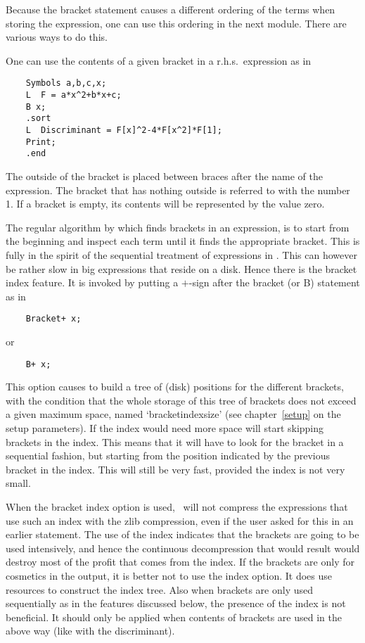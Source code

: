 Because the bracket statement causes a different ordering of the terms when 
storing the expression, one can use this ordering in the next module. There 
are various ways to do this.

One can use the contents of a given bracket in a r.h.s.\ expression as in
\begin{verbatim}
    Symbols a,b,c,x;
    L  F = a*x^2+b*x+c;
    B x;
    .sort
    L  Discriminant = F[x]^2-4*F[x^2]*F[1];
    Print;
    .end
\end{verbatim}
The outside of the bracket is placed between braces after the 
name of the expression. The bracket that has nothing outside is referred to 
with the number 1. If a bracket is empty, its contents will be represented 
by the value zero.

The regular algorithm by which \FORM{} finds brackets in an expression, is 
to start from the beginning and inspect each term until it finds the 
appropriate bracket. This is fully in the spirit of the sequential 
treatment of expressions in \FORM{}. This can however be rather 
slow in big 
expressions that reside on a disk. Hence there is the bracket 
index 
feature. It is invoked by putting a $+$-sign after the bracket (or B) 
statement as in 
\begin{verbatim}
    Bracket+ x;
\end{verbatim}
or
\begin{verbatim}
    B+ x;
\end{verbatim}
This option causes \FORM{} to build a tree of (disk) positions for the 
different brackets, with the condition that the whole storage of this tree 
of brackets does not exceed a given maximum space, named 
`bracketindexsize' 
(see chapter~\ref{setup} on the setup parameters). 
If the index would need more space \FORM{} will start 
skipping brackets in the index. This means that it will have to look for 
the bracket in a sequential fashion, but starting from the position 
indicated by the previous bracket in the index. This will still be very 
fast, provided the index is not very small.

When the bracket index option is used, \FORM\ will not compress the 
expressions that use such an index with the zlib compression, even if the 
user asked for this in an earlier statement. The use of the index indicates 
that the brackets are going to be used intensively, and hence the 
continuous decompression that would result would destroy most of the profit 
that comes from the index. If the brackets are only for cosmetics in the 
output, it is better not to use the index option. It does use resources to 
construct the index tree. Also when 
brackets are only used sequentially as in the features discussed below, the 
presence of the index is not beneficial. It should only be applied when 
contents of brackets are used in the above way (like with the 
discriminant).

